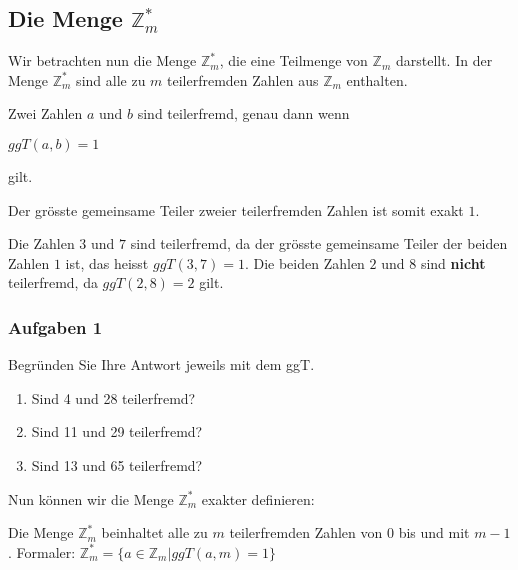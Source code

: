\subsection{Die Menge $\mathbb{Z}_m^*$}

Wir betrachten nun die Menge $\mathbb{Z}_m^*$, die eine Teilmenge von $\mathbb{Z}_m$ darstellt. In der Menge $\mathbb{Z}_m^*$ sind alle zu $m$ teilerfremden Zahlen aus $\mathbb{Z}_m$ enthalten.

\begin{definition}[Teilerfremd]
	Zwei Zahlen $a$ und $b$ sind teilerfremd, genau dann wenn 
	
	\begin{center}
	$ggT(a, b) = 1$
	\end{center}
	
	 gilt.
\end{definition}

Der grösste gemeinsame Teiler zweier teilerfremden Zahlen ist somit exakt $1$. 

\begin{example}
	Die Zahlen $3$ und $7$ sind teilerfremd, da der grösste gemeinsame Teiler der beiden Zahlen $1$ ist, das heisst $ggT(3, 7) = 1$. Die beiden Zahlen $2$ und $8$ sind \textbf{nicht} teilerfremd, da $ggT(2, 8) = 2$ gilt.
\end{example}

\subsubsection{Aufgaben 1}

Begründen Sie Ihre Antwort jeweils mit dem \ac{ggT}.

\begin{enumerate}
\item Sind \num{4} und \num{28} teilerfremd?

\fillwithgrid{0.5in}

\item Sind \num{11} und \num{29} teilerfremd?

\fillwithgrid{0.5in}

\item Sind \num{13} und \num{65} teilerfremd?

\fillwithgrid{0.5in}

\end{enumerate}

Nun können wir die Menge $\mathbb{Z}_m^*$ exakter definieren:

\begin{definition}[$\mathbb{Z}_m^*$]
	Die Menge $\mathbb{Z}_m^*$ beinhaltet alle zu $m$ teilerfremden Zahlen von $0$ bis und mit $m-1$. Formaler: $\mathbb{Z}_m^* = \{a \in \mathbb{Z}_m | ggT(a, m) = 1 \}$
\end{definition}

